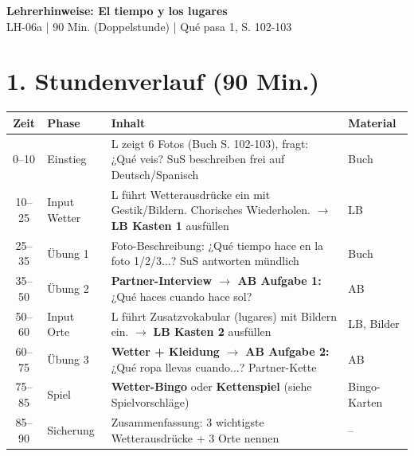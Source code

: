 \documentclass[11pt, a4paper]{article}
\newcommand{\fachfarbe}{spanisch}
\newcommand{\thema}{El tiempo y los lugares}
\newcommand{\sequenz}{06}
\newcommand{\block}{a}
\newcommand{\dauer}{90 Min. (Doppelstunde)}
\begin{document}

\begin{center}
    {\Large\bfseries\textcolor{\fachfarbe}{Lehrerhinweise: \thema}}\\[0.3em]
    {\normalsize LH-\sequenz\block{} | \dauer{} | Qué pasa 1, S. 102-103}
\end{center}

\vspace{10pt}


\section*{1. Stundenverlauf (90 Min.)}

\begin{tabularx}{\textwidth}{|c|l|X|l|}
\hline
\textbf{Zeit} & \textbf{Phase} & \textbf{Inhalt} & \textbf{Material} \\
\hline
0--10 & Einstieg & L zeigt 6 Fotos (Buch S. 102-103), fragt: ¿Qué veis? SuS beschreiben frei auf Deutsch/Spanisch & Buch \\
\hline
10--25 & Input Wetter & L führt Wetterausdrücke ein mit Gestik/Bildern. Chorisches Wiederholen. $\rightarrow$ \textbf{LB Kasten 1} ausfüllen & LB \\
\hline
25--35 & Übung 1 & Foto-Beschreibung: ¿Qué tiempo hace en la foto 1/2/3...? SuS antworten mündlich & Buch \\
\hline
35--50 & Übung 2 & \textbf{Partner-Interview $\rightarrow$ AB Aufgabe 1:} ¿Qué haces cuando hace sol? & AB \\
\hline
50--60 & Input Orte & L führt Zusatzvokabular (lugares) mit Bildern ein. $\rightarrow$ \textbf{LB Kasten 2} ausfüllen & LB, Bilder \\
\hline
60--75 & Übung 3 & \textbf{Wetter + Kleidung $\rightarrow$ AB Aufgabe 2:} ¿Qué ropa llevas cuando...? Partner-Kette & AB \\
\hline
75--85 & Spiel & \textbf{Wetter-Bingo} oder \textbf{Kettenspiel} (siehe Spielvorschläge) & Bingo-Karten \\
\hline
85--90 & Sicherung & Zusammenfassung: 3 wichtigste Wetterausdrücke + 3 Orte nennen & -- \\
\hline
\end{tabularx}
\end{document}
